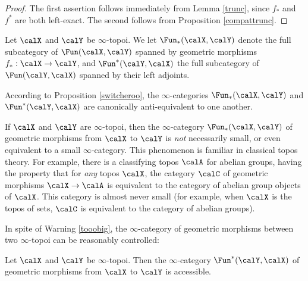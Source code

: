 \begin{proof}
The first assertion follows immediately from Lemma \ref{trunc}, since $f_{\ast}$ and $f^{\ast}$ are both left-exact. The second follows from Proposition \ref{compattrunc}.
\end{proof}

\begin{definition}\label{defhomst}
Let $\calX$ and $\calY$ be $\infty$-topoi. We let
$\Fun_{\ast}(\calX, \calY)$ denote the full subcategory of $\Fun(\calX,\calY)$ spanned by
geometric morphisms $f_{\ast}: \calX \rightarrow \calY$, and
$\Fun^{\ast}(\calY, \calX)$ the full subcategory of $\Fun(\calY,\calX)$ spanned by
their left adjoints.
\end{definition}

\begin{remark}
According to Proposition \ref{switcheroo}, the $\infty$-categories
$\Fun_{\ast}(\calX, \calY)$ and $\Fun^{\ast}(\calY, \calX)$ are canonically anti-equivalent to one another.
\end{remark}

\begin{warning}\label{tooobig}
If $\calX$ and $\calY$ are $\infty$-topoi, then the $\infty$-category $\Fun_{\ast}(\calX, \calY)$ of
geometric morphisms from $\calX$ to $\calY$ is {\em not} necessarily small, or even equivalent to a small $\infty$-category. This phenomenon is familiar in classical topos theory. For example,
there is a classifying topos $\calA$ for abelian groups, having the property that for {\em any} topos
$\calX$, the category $\calC$ of geometric morphisms $\calX \rightarrow \calA$ is equivalent to the category of abelian group objects of $\calX$. This category is almost never small (for example, when $\calX$ is the topos of sets, $\calC$ is equivalent to the category of abelian groups).
\end{warning}

In spite of Warning \ref{tooobig}, the $\infty$-category of geometric morphisms between two $\infty$-topoi can be reasonably controlled:

\begin{proposition}\label{nottoobig}
Let $\calX$ and $\calY$ be $\infty$-topoi. Then the
$\infty$-category $\Fun^{\ast}(\calY, \calX)$ of geometric morphisms from
$\calX$ to $\calY$ is accessible.
\end{proposition}

